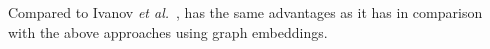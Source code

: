 Compared to Ivanov {\em et al.}~\cite{ivanov21predicting}, {\tool} has
the same advantages as it has in comparison with the above approaches
using graph embeddings.





